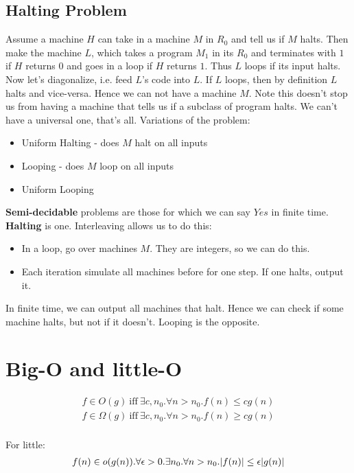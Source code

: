 \documentclass{article}
\begin{document}
\subsection{Halting Problem}
Assume a machine $H$ can take in a machine $M$ in $R_0$ and tell us if $M$ halts. Then make the machine $L$, which takes a program $M_1$ in its $R_0$ and terminates with $1$ if $H$ returns $0$ and goes in a loop if $H$ returns $1$. Thus $L$ loops if its input halts. Now let's diagonalize, i.e. feed $L$'s code into $L$. If $L$ loops, then by definition $L$ halts and vice-versa. Hence we can not have a machine $M$. Note this doesn't stop us from having a machine that tells us if a subclass of program halts. We can't have a universal one, that's all.
\vskip 0.1in
Variations of the problem:
\begin{itemize}
    \item Uniform Halting - does $M$ halt on all inputs
    \item Looping - does $M$ loop on all inputs
    \item Uniform Looping
\end{itemize}
\vskip 0.1in
\textbf{Semi-decidable} problems are those for which we can say $Yes$ in finite time. \textbf{Halting} is one. Interleaving allows us to do this:
\begin{itemize}
    \item In a loop, go over machines $M$. They are integers, so we can do this.
    \item Each iteration simulate all machines before for one step. If one halts, output it.
\end{itemize}

In finite time, we can output all machines that halt. Hence we can check if some machine halts, but not if it doesn't. Looping is the opposite.

\section{Big-O and little-O}
\begin{align*}
    f \in O(g)\ \text{iff}\ \exists c, n_0 . \forall n > n_0 . f(n) \leq cg(n) \\
    f \in \Omega(g)\ \text{iff}\ \exists c, n_0 . \forall n > n_0 . f(n) \geq cg(n) \\
\end{align*}

For little:
\begin{align*}
    f(n) \in o(g(n)) . \forall \epsilon > 0. \exists n_0 . \forall n > n_0 .
    \abs{f(n)} \leq \epsilon \abs{g(n)}
\end{align*}
\end{document}
